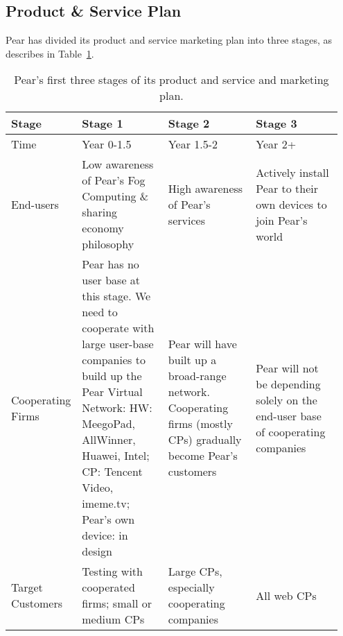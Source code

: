 \subsection{Product \& Service Plan}
Pear has divided its product and service marketing plan into three stages, as describes in Table~\ref{tb:product-market-plan}. 
\begin{table}[htb]
	\centering
	\caption{Pear's first three stages of its product and service and marketing plan.}\label{tb:product-market-plan}
	\footnotesize
	\begin{tabular}{p{0.11\linewidth}p{0.28\linewidth}p{0.28\linewidth}p{0.28\linewidth}}  
		\toprule
		Stage &    Stage 1    & Stage 2 & Stage 3 \\
		\midrule 
		Time & Year 0-1.5 & Year 1.5-2 & Year 2+ \\
		End-users & Low awareness of Pear's Fog Computing \& sharing economy philosophy & High awareness of Pear's services & Actively install Pear to their own devices to join Pear's world\\
		Cooperating Firms & {Pear has no user base at this stage. We need to cooperate with large user-base companies to build up the Pear Virtual Network: HW: MeegoPad, AllWinner, Huawei, Intel; CP: Tencent Video, imeme.tv; Pear's own device: in design} & {Pear will have built up a broad-range network. Cooperating firms (mostly CPs) gradually become Pear's customers} & {Pear will not be depending solely on the end-user base of cooperating companies}\\
		Target Customers & {Testing with cooperated firms; small or medium CPs} & {Large CPs, especially cooperating companies} &    All web CPs\\    
		\bottomrule
	\end{tabular}
\end{table}

